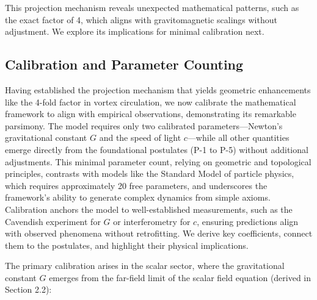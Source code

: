 \medskip
\noindent
{}
\medskip

This projection mechanism reveals unexpected mathematical patterns, such as the exact factor of 4, which aligns with gravitomagnetic scalings without adjustment. We explore its implications for minimal calibration next.

\subsection{Calibration and Parameter Counting}

Having established the projection mechanism that yields geometric enhancements like the 4-fold factor in vortex circulation, we now calibrate the mathematical framework to align with empirical observations, demonstrating its remarkable parsimony. The model requires only two calibrated parameters---Newton's gravitational constant $G$ and the speed of light $c$---while all other quantities emerge directly from the foundational postulates (P-1 to P-5) without additional adjustments. This minimal parameter count, relying on geometric and topological principles, contrasts with models like the Standard Model of particle physics, which requires approximately 20 free parameters, and underscores the framework's ability to generate complex dynamics from simple axioms. Calibration anchors the model to well-established measurements, such as the Cavendish experiment for $G$ or interferometry for $c$, ensuring predictions align with observed phenomena without retrofitting. We derive key coefficients, connect them to the postulates, and highlight their physical implications.

The primary calibration arises in the scalar sector, where the gravitational constant $G$ emerges from the far-field limit of the scalar field equation (derived in Section 2.2):

